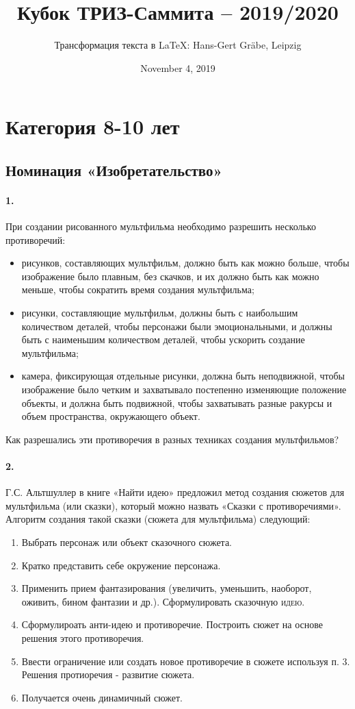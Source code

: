 \documentclass[11pt,a4paper]{article}
\title{Кубок ТРИЗ-Саммита – 2019/2020}
\author{Трансформация текста в \LaTeX: Hans-Gert Gr\"abe, Leipzig}
\date{November 4, 2019}
\begin{document}
\maketitle

\section*{Категория 8-10 лет}

\subsection*{Номинация «Изобретательство»}

\paragraph{1.}
При создании рисованного мультфильма необходимо разрешить несколько
противоречий:
\begin{itemize}
\item рисунков, составляющих мультфильм, должно быть как можно больше, чтобы
  изображение было плавным, без скачков, и их должно быть как можно меньше,
  чтобы сократить время создания мультфильма;
\item рисунки, составляющие мультфильм, должны быть с наибольшим количеством
  деталей, чтобы персонажи были эмоциональными, и должны быть с наименьшим
  количеством деталей, чтобы ускорить создание мультфильма;
\item камера, фиксирующая отдельные рисунки, должна быть неподвижной, чтобы
  изображение было четким и захватывало постепенно изменяющие положение
  объекты, и должна быть подвижной, чтобы захватывать разные ракурсы и объем
  пространства, окружающего объект.
\end{itemize}
Как разрешались эти противоречия в разных техниках создания мультфильмов?

\paragraph{2.}
Г.С. Альтшуллер в книге «Найти идею» предложил метод создания сюжетов для
мультфильма (или сказки), который можно назвать «Сказки с противоречиями».
Алгоритм создания такой сказки (сюжета для мультфильма) следующий:

\begin{enumerate}
\item Выбрать персонаж или объект сказочного сюжета.
\item Кратко представить себе окружение персонажа.
\item Применить прием фантазирования (увеличить, уменьшить, наоборот, оживить,
  бином фантазии и др.). Сформулировать сказочную \textsc{идею}.
\item Сформулироать анти-идею и противоречие. Построить сюжет на основе
  решения этого противоречия.
\item Ввести ограничение или создать новое противоречие в сюжете используя
  п. 3. Решения протиоречия - развитие сюжета.
\item Получается очень динамичный сюжет.
\end{enumerate}
\end{document}
